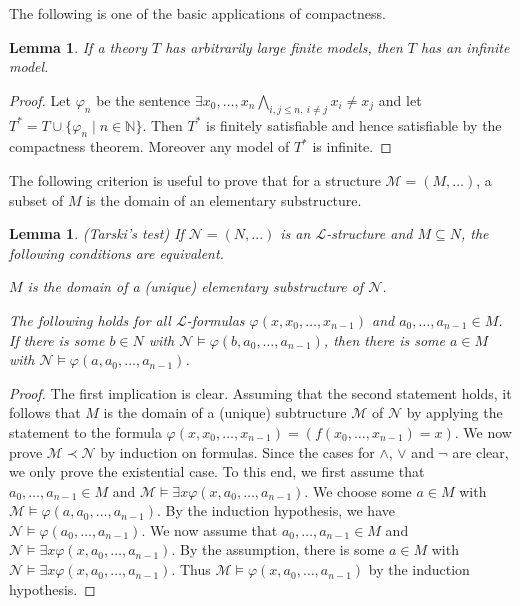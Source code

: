 \documentclass[10pt]{amsart}
\renewcommand{\L}{\mathcal{L}}
\newcommand{\NNN}{\mathbb{N}}
\newcommand{\MM}{\mathcal{M}}
\newcommand{\NN}{\mathcal{N}}
\newtheorem{lemma}[theorem]{Lemma}
\theoremstyle{definition}
\theoremstyle{remark}
\newenvironment{enumerate-(a)}{\begin{enumerate}[label={\upshape (\alph*)}, leftmargin=2pc]}{\end{enumerate}}
\begin{document}
The following is one of the basic applications of compactness. 

\begin{lemma} 
If a theory $T$ has arbitrarily large finite models, then $T$ has an infinite model. 
\end{lemma} 
\begin{proof} 
Let $\varphi_n$ be the sentence $\exists x_0,\dots,x_n \bigwedge_{i,j\leq n,\ i\neq j} x_i\neq x_j$ and let $T^*=T\cup\{\varphi_n\mid n\in\NNN\}$. Then $T^*$ is finitely satisfiable and hence satisfiable by the compactness theorem. Moreover any model of $T^*$ is infinite. 
\end{proof} 

The following criterion is useful to prove that for a structure $\MM=(M,\dots)$, a subset of $M$ is the domain of an elementary substructure. 

\begin{lemma} \label{Tarskis test} (Tarski's test) 
If $\NN=(N,...)$ is an $\L$-structure and $M\subseteq N$, 
the following conditions are equivalent. 
\begin{enumerate-(a)} 
\item 
$M$ is the domain of a (unique) elementary substructure of $\NN$. 
\item 
The following holds for all $\L$-formulas $\varphi(x,x_0,\dots,x_{n-1})$ and $a_0,\dots, a_{n-1}\in M$. If there is some $b\in N$ with $\NN\models \varphi(b,a_0,\dots,a_{n-1})$, then there is some $a\in M$ with $\NN\models \varphi(a,a_0,\dots,a_{n-1})$. 
\end{enumerate-(a)} 
\end{lemma} 
\begin{proof} 
The first implication is clear. Assuming that the second statement holds, it follows that $M$ is the domain of a (unique) subtructure $\MM$ of $\NN$ by applying the statement to the formula $\varphi(x,x_0,\dots,x_{n-1})=(f(x_0,\dots,x_{n-1})=x)$. We now prove $\MM\prec \NN$ by induction on formulas. Since the cases for $\wedge$, $\vee$ and $\neg$ are clear, we only prove the existential case. To this end, we first assume that $a_0,\dots, a_{n-1}\in M$ and $\MM\models \exists x \varphi(x,a_0,\dots,a_{n-1})$. We choose some $a\in M$ with $\MM\models \varphi(a,a_0,\dots,a_{n-1})$. By the induction hypothesis, we have $\NN\models \varphi(a_0,\dots,a_{n-1})$. We now assume that $a_0,\dots, a_{n-1}\in M$ and $\NN\models \exists x \varphi(x,a_0,\dots,a_{n-1})$. By the assumption, there is some $a\in M$ with $\NN\models \exists x \varphi(x,a_0,\dots,a_{n-1})$. Thus $\MM\models \varphi(x,a_0,\dots,a_{n-1})$ by the induction hypothesis. 
\end{proof} 
\end{document}
